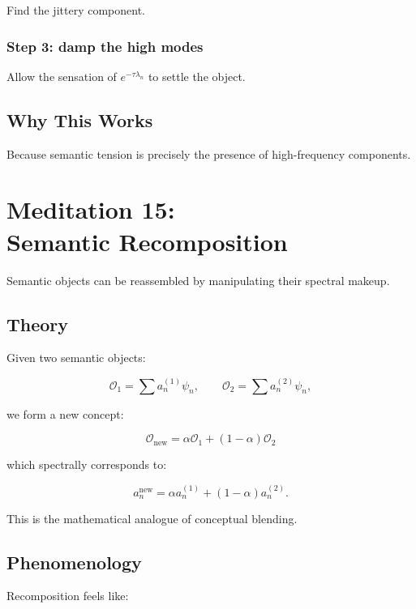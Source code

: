 \documentclass[12pt]{article}
\begin{document}
Find the jittery component.

\subsection*{Step 3: damp the high modes}

Allow the sensation of $e^{-\tau\lambda_n}$ to settle the object.

\section{Why This Works}

Because semantic tension is precisely the presence of high-frequency components.

\newpage


\chapter{Meditation 15:\\ Semantic Recomposition}

Semantic objects can be reassembled by manipulating their spectral makeup.

\section{Theory}

Given two semantic objects:

\[
\mathcal{O}_1 = \sum a_n^{(1)} \psi_n,
\qquad
\mathcal{O}_2 = \sum a_n^{(2)} \psi_n,
\]

we form a new concept:

\[
\mathcal{O}_{\mathrm{new}}
= \alpha \mathcal{O}_1 + (1-\alpha)\mathcal{O}_2
\]

which spectrally corresponds to:

\[
a_n^{\mathrm{new}}
= \alpha a_n^{(1)} + (1-\alpha)a_n^{(2)}.
\]

This is the mathematical analogue of conceptual blending.

\section{Phenomenology}

Recomposition feels like:
\end{document}
